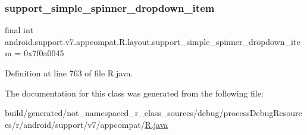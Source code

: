 \subsubsection{\texorpdfstring{support\_simple\_spinner\_dropdown\_item}{support\_simple\_spinner\_dropdown\_item}}
{\footnotesize\ttfamily final int android.\+support.\+v7.\+appcompat.\+R.\+layout.\+support\+\_\+simple\+\_\+spinner\+\_\+dropdown\+\_\+item = 0x7f0a0045\hspace{0.3cm}{\ttfamily [static]}}



Definition at line 763 of file R.\+java.



The documentation for this class was generated from the following file\+:\begin{DoxyCompactItemize}
\item 
build/generated/not\+\_\+namespaced\+\_\+r\+\_\+class\+\_\+sources/debug/process\+Debug\+Resources/r/android/support/v7/appcompat/\mbox{\hyperlink{android_2support_2v7_2appcompat_2_r_8java}{R.\+java}}\end{DoxyCompactItemize}

